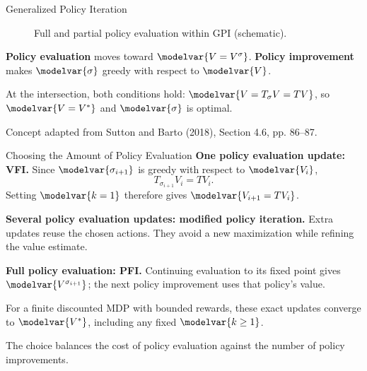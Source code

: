 \begin{frame}{Generalized Policy Iteration}
\begin{figure}
\caption{Full and partial policy evaluation within GPI (schematic).}
\end{figure}
\vspace{-.15cm}
{\footnotesize
\textcolor{CourseVariableColor}{\textbf{Policy evaluation}} moves toward \(\modelvar{V=V^\sigma}\).
\textcolor{SessionTeal}{\textbf{Policy improvement}} makes \(\modelvar{\sigma}\) greedy with respect to \(\modelvar{V}\).
\par\smallskip
At the intersection, both conditions hold: \(\modelvar{V=T_\sigma V=TV}\), so \(\modelvar{V=V^*}\) and \(\modelvar{\sigma}\) is optimal.
\par\smallskip
\textcolor{SessionMuted}{Concept adapted from Sutton and Barto (2018), Section 4.6, pp. 86--87.}}
\end{frame}

\begin{frame}{Choosing the Amount of Policy Evaluation}
\small
\textbf{One policy evaluation update: VFI.} Since \(\modelvar{\sigma_{i+1}}\) is greedy with respect to \(\modelvar{V_i}\),
\[T_{\sigma_{i+1}}V_i=TV_i.\]
Setting \(\modelvar{k=1}\) therefore gives \(\modelvar{V_{i+1}=TV_i}\).
\par\medskip
\textbf{Several policy evaluation updates: modified policy iteration.} Extra updates reuse the chosen actions. They avoid a new maximization while refining the value estimate.
\par\medskip
\textbf{Full policy evaluation: PFI.} Continuing evaluation to its fixed point gives \(\modelvar{V^{\sigma_{i+1}}}\); the next policy improvement uses that policy's value.
\par\medskip
For a finite discounted MDP with bounded rewards, these exact updates converge to \(\modelvar{V^*}\), including any fixed \(\modelvar{k\geq1}\).
\par\smallskip
The choice balances the cost of policy evaluation against the number of policy improvements.
\end{frame}

